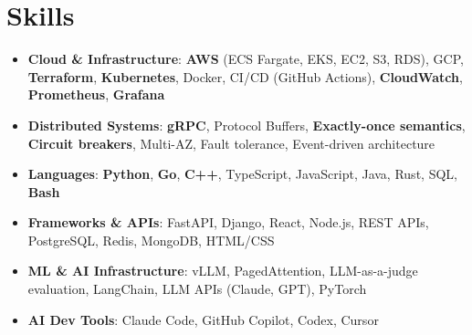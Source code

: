 \documentclass[letterpaper,11pt]{article}
\newcommand{\resumeSubHeadingListStart}{\begin{itemize}[leftmargin=0.15in, label={}]}
\newcommand{\resumeSubHeadingListEnd}{\end{itemize}}
\newcommand{\resumeSkillHeading}[2]{%
  \item\small{\textbf{#1}: #2 \vspace{-9pt}}%
}
\begin{document}
\section{Skills}
  \resumeSubHeadingListStart
    \resumeSkillHeading{Cloud \& Infrastructure}{\textbf{AWS} (ECS Fargate, EKS, EC2, S3, RDS), GCP, \textbf{Terraform}, \textbf{Kubernetes}, Docker, CI/CD (GitHub Actions), \textbf{CloudWatch}, \textbf{Prometheus}, \textbf{Grafana}}
    \resumeSkillHeading{Distributed Systems}{\textbf{gRPC}, Protocol Buffers, \textbf{Exactly-once semantics}, \textbf{Circuit breakers}, Multi-AZ, Fault tolerance, Event-driven architecture}
    \resumeSkillHeading{Languages}{\textbf{Python}, \textbf{Go}, \textbf{C++}, TypeScript, JavaScript, Java, Rust, SQL, \textbf{Bash}}
    \resumeSkillHeading{Frameworks \& APIs}{FastAPI, Django, React, Node.js, REST APIs, PostgreSQL, Redis, MongoDB, HTML/CSS}
    \resumeSkillHeading{ML \& AI Infrastructure}{vLLM, PagedAttention, LLM-as-a-judge evaluation, LangChain, LLM APIs (Claude, GPT), PyTorch}
    \resumeSkillHeading{AI Dev Tools}{Claude Code, GitHub Copilot, Codex, Cursor}
  \resumeSubHeadingListEnd
\end{document}
